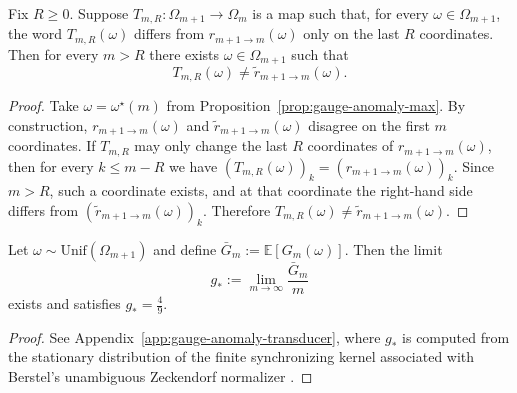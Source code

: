\begin{corollary}\label{cor:gauge-anomaly-tail-incomplete}
Fix $R\ge 0$.
Suppose $T_{m,R}:\Omega_{m+1}\to\Omega_m$ is a map such that, for every $\omega\in\Omega_{m+1}$, the word $T_{m,R}(\omega)$ differs from $r_{m+1\to m}(\omega)$ only on the last $R$ coordinates.
Then for every $m>R$ there exists $\omega\in\Omega_{m+1}$ such that
\[
T_{m,R}(\omega)\neq \widetilde r_{m+1\to m}(\omega).
\]
\end{corollary}
\begin{proof}
Take $\omega=\omega^\star(m)$ from Proposition~\ref{prop:gauge-anomaly-max}.
By construction, $r_{m+1\to m}(\omega)$ and $\widetilde r_{m+1\to m}(\omega)$ disagree on the first $m$ coordinates.
If $T_{m,R}$ may only change the last $R$ coordinates of $r_{m+1\to m}(\omega)$, then for every $k\le m-R$ we have
\(
(T_{m,R}(\omega))_k=(r_{m+1\to m}(\omega))_k
\).
Since $m>R$, such a coordinate exists, and at that coordinate the right-hand side differs from $(\widetilde r_{m+1\to m}(\omega))_k$.
Therefore $T_{m,R}(\omega)\neq \widetilde r_{m+1\to m}(\omega)$.
\end{proof}

\begin{proposition}\label{prop:gauge-anomaly-density-49}
Let $\omega\sim\mathrm{Unif}(\Omega_{m+1})$ and define $\bar G_m:=\mathbb E[G_m(\omega)]$.
Then the limit
\[
g_\ast:=\lim_{m\to\infty}\frac{\bar G_m}{m}
\]
exists and satisfies $g_\ast=\frac{4}{9}$.
\end{proposition}
\begin{proof}
See Appendix~\ref{app:gauge-anomaly-transducer}, where $g_\ast$ is computed from the stationary distribution of the finite synchronizing kernel associated with Berstel's unambiguous Zeckendorf normalizer \cite{ITA_2001__35_6_491_0}.
\end{proof}

